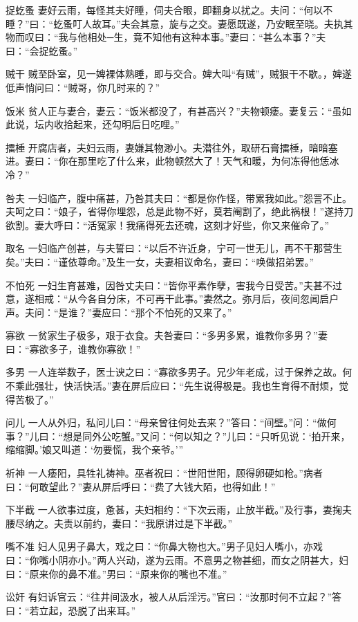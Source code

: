 \documentclass[12pt,UTF8]{ctexbook}
\begin{document}
捉虼蚤
妻好云雨，每怪其夫好睡，伺夫合眼，即翻身以扰之。夫问：“何以不睡？”曰：“虼蚤叮人故耳。”夫会其意，旋与之交。妻愿既遂，乃安眠至晓。夫执其物而叹曰：“我与他相处─生，竟不知他有这种本事。”妻曰：“甚么本事？”夫曰：“会捉虼蚤。”

贼干
贼至卧室，见一婢裸体熟睡，即与交合。婢大叫“有贼”，贼狠干不歇。，婢遂低声悄问曰：“贼哥，你几时来的？”

饭米
贫人正与妻合，妻云：“饭米都没了，有甚高兴？”夫物顿痿。妻复云：“虽如此说，坛内收拾起来，还勾明后日吃哩。”

擂棰
开腐店者，夫妇云雨，妻嫌其物渺小。夫潜往外，取研石膏擂棰，暗暗塞进。妻曰：“你在那里吃了什么来，此物顿然大了！天气和暖，为何冻得他恁冰冷？”

咎夫
一妇临产，腹中痛甚，乃咎其夫曰：“都是你作怪，带累我如此。”怨詈不止。夫呵之曰：“娘子，省得你埋怨，总是此物不好，莫若阉割了，绝此祸根！”遂持刀欲割。妻大呼曰：“活冤家！我痛得死去还魂，这刻才好些，你又来催命了。”

取名
一妇临产创甚，与夫誓曰：“以后不许近身，宁可一世无儿，再不干那营生矣。”夫曰：“谨依尊命。”及生一女，夫妻相议命名，妻曰：“唤做招弟罢。”

不怕死
一妇生育甚难，因咎丈夫曰：“皆你平素作孽，害我今日受苦。”夫甚不过意，遂相戒：“从今各自分床，不可再干此事。”妻然之。弥月后，夜间忽闻启户声。夫问：“是谁？”妻应曰：“那个不怕死的又来了。”

寡欲
一贫家生子极多，艰于衣食。夫咎妻曰：“多男多累，谁教你多男？”妻曰：“寡欲多子，谁教你寡欲！”

多男
一人连举数子，医士谀之曰：“寡欲多男子。兄少年老成，过于保养之故。何不乘此强壮，快活快活。”妻在屏后应曰：“先生说得极是。我也生育得不耐烦，觉得苦极了。”

问儿
一人从外归，私问儿曰：“母亲曾往何处去来？”答曰：“间壁。”问：“做何事？”儿曰：“想是同外公吃蟹。”又问：“何以知之？”儿曰：“只听见说：‘拍开来，缩缩脚。’娘又叫道：‘勿要慌，我个亲爷。’”

祈神
一人痿阳，具牲礼祷神。巫者祝曰：“世阳世阳，顾得卵硬如枪。”病者曰：“何敢望此？”妻从屏后呼曰：“费了大钱大陌，也得如此！”

下半截
一人欲事过度，惫甚，夫妇相约：“下次云雨，止放半截。”及行事，妻掬夫腰尽纳之。夫责以前约，妻曰：“我原讲过是下半截。”

嘴不准
妇人见男子鼻大，戏之曰：“你鼻大物也大。”男子见妇人嘴小，亦戏曰：“你嘴小阴亦小。”两人兴动，遂为云雨。不意男之物甚细，而女之阴甚大，妇曰：“原来你的鼻不准。”男曰：“原来你的嘴也不准。”

讼奸
有妇诉官云：“往井间汲水，被人从后淫污。”官曰：“汝那时何不立起？”答曰：“若立起，恐脱了出来耳。”
\end{document}
